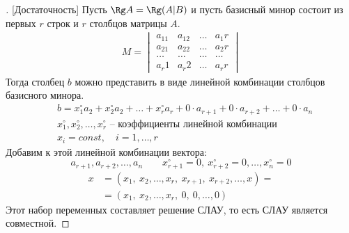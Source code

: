 \begin{proof}[][Достаточность]
Пусть $\Rg A = \Rg (A|B)$ и пусть базисный минор состоит из первых $r$ строк и $r$ столбцов матрицы $A$. \vspace{-\topsep}
\begin{gather*}
M = \begin{vmatrix} 
a_11 & a_12 & \ldots & a_1r \\
a_21 & a_22 & \ldots & a_2r \\
\ldots & \ldots & \ldots & \ldots\\
a_r1 & a_r2 & \ldots & a_rr 
\end{vmatrix} 
\end{gather*}
Тогда столбец $b$ можно представить в виде линейной комбинации столбцов базисного минора.
\begin{align*} 
&b = x_1^\circ a_2 + x_2^\circ a_2 + \ldots + x_r^\circ a_r + 0\cdot a_{r+1} + 0\cdot a_{r+2} + \ldots + 0\cdot a_n\\
&x_1^\circ, x_2^\circ,\ldots, x_r^\circ \text{ -- коэффициенты линейной комбинации}\\
&x_i = const,\quad i=1, \ldots, r
\end{align*}
Добавим к этой линейной комбинации вектора:
\[ a_{r+1},a_{r+2},\ldots,a_n \qquad x_{r+1}^\circ = 0,\ x_{r+2}^\circ = 0,\ldots,x_n^\circ = 0 \] \vspace{-3\topsep}
\begin{align*}
x &= (x_1,\ x_2, \ldots, x_r,\ x_{r+1},\ x_{r+2},\ldots,x) = \\
&= (x_1,\ x_2, \ldots,  x_r,\ 0,\ 0,\ldots, 0)
\end{align*}
Этот набор переменных составляет решение СЛАУ, то есть СЛАУ является совместной.
\end{proof}
